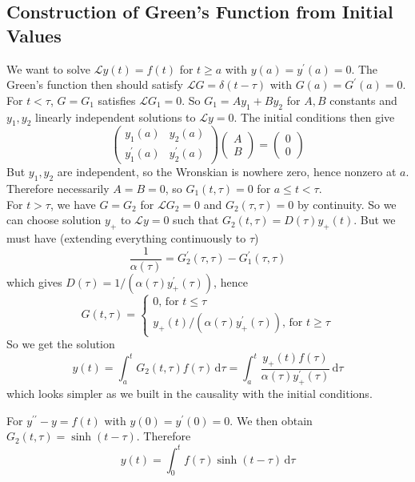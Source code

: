 \subsection{Construction of Green's Function from Initial Values}
We want to solve $\mathcal Ly(t)=f(t)$ for $t\ge a$ with $y(a)=y^\prime(a)=0$.
The Green's function then should satisfy $\mathcal LG=\delta(t-\tau)$ with $G(a)=G^\prime(a)=0$.
For $t<\tau$, $G=G_1$ satisfies $\mathcal LG_1=0$.
So $G_1=Ay_1+By_2$ for $A,B$ constants and $y_1,y_2$ linearly independent solutions to $\mathcal Ly=0$.
The initial conditions then give
$$\begin{pmatrix}
    y_1(a)&y_2(a)\\
    y_1^\prime(a)&y_2^\prime(a)
\end{pmatrix}\begin{pmatrix}
    A\\
    B
\end{pmatrix}=\begin{pmatrix}
    0\\
    0
\end{pmatrix}$$
But $y_1,y_2$ are independent, so the Wronskian is nowhere zero, hence nonzero at $a$.
Therefore necessarily $A=B=0$, so $G_1(t,\tau)=0$ for $a\le t<\tau$.\\
For $t>\tau$, we have $G=G_2$ for $\mathcal LG_2=0$ and $G_2(\tau,\tau)=0$ by continuity.
So we can choose solution $y_+$ to $\mathcal Ly=0$ such that $G_2(t,\tau)=D(\tau)y_+(t)$.
But we must have (extending everything continuously to $\tau$)
$$\frac{1}{\alpha(\tau)}=G_2^\prime(\tau,\tau)-G_1^\prime(\tau,\tau)$$
which gives $D(\tau)=1/(\alpha(\tau)y_+^\prime(\tau))$, hence
$$G(t,\tau)=\begin{cases}
    0\text{, for $t\le\tau$}\\
    y_+(t)/(\alpha(\tau)y_+^\prime(\tau))\text{, for $t\ge\tau$}
\end{cases}$$
So we get the solution
$$y(t)=\int_a^tG_2(t,\tau)f(\tau)\,\mathrm d\tau=\int_a^t\frac{y_+(t)f(\tau)}{\alpha(\tau)y_+^\prime(\tau)}\,\mathrm d\tau$$
which looks simpler as we built in the causality with the initial conditions.
\begin{example}
    For $y^{\prime\prime}-y=f(t)$ with $y(0)=y^\prime(0)=0$.
    We then obtain $G_2(t,\tau)=\sinh(t-\tau)$.
    Therefore
    $$y(t)=\int_0^tf(\tau)\sinh(t-\tau)\,\mathrm d\tau$$
\end{example}